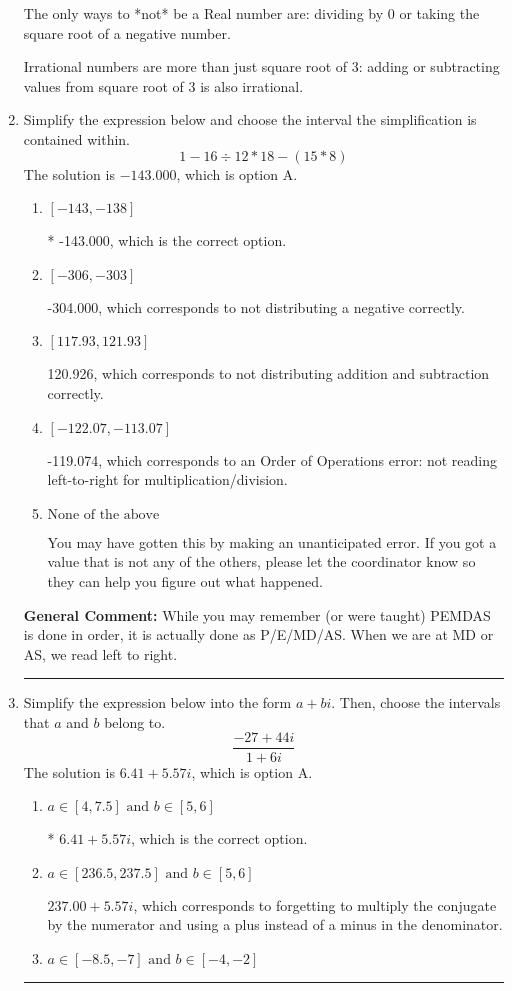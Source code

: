 \documentclass{extbook}[14pt]
\newcommand{\litem}[1]{\item #1

\rule{\textwidth}{0.4pt}}
\begin{document}
\begin{enumerate}
{ The only ways to *not* be a Real number are: dividing by 0 or taking the square root of a negative number. 
 
 Irrational numbers are more than just square root of 3: adding or subtracting values from square root of 3 is also irrational.
}
\litem{
Simplify the expression below and choose the interval the simplification is contained within.
\[ 1 - 16 \div 12 * 18 - (15 * 8) \]The solution is \( -143.000 \), which is option A.\begin{enumerate}[label=\Alph*.]
\item \( [-143, -138] \)

* -143.000, which is the correct option.
\item \( [-306, -303] \)

 -304.000, which corresponds to not distributing a negative correctly.
\item \( [117.93, 121.93] \)

 120.926, which corresponds to not distributing addition and subtraction correctly.
\item \( [-122.07, -113.07] \)

 -119.074, which corresponds to an Order of Operations error: not reading left-to-right for multiplication/division.
\item \( \text{None of the above} \)

 You may have gotten this by making an unanticipated error. If you got a value that is not any of the others, please let the coordinator know so they can help you figure out what happened.
\end{enumerate}

\textbf{General Comment:} While you may remember (or were taught) PEMDAS is done in order, it is actually done as P/E/MD/AS. When we are at MD or AS, we read left to right.
}
\litem{
Simplify the expression below into the form $a+bi$. Then, choose the intervals that $a$ and $b$ belong to.
\[ \frac{-27 + 44 i}{1 + 6 i} \]The solution is \( 6.41  + 5.57 i \), which is option A.\begin{enumerate}[label=\Alph*.]
\item \( a \in [4, 7.5] \text{ and } b \in [5, 6] \)

* $6.41  + 5.57 i$, which is the correct option.
\item \( a \in [236.5, 237.5] \text{ and } b \in [5, 6] \)

 $237.00  + 5.57 i$, which corresponds to forgetting to multiply the conjugate by the numerator and using a plus instead of a minus in the denominator.
\item \( a \in [-8.5, -7] \text{ and } b \in [-4, -2] \)


\end{enumerate}}
\end{enumerate}
\end{document}
